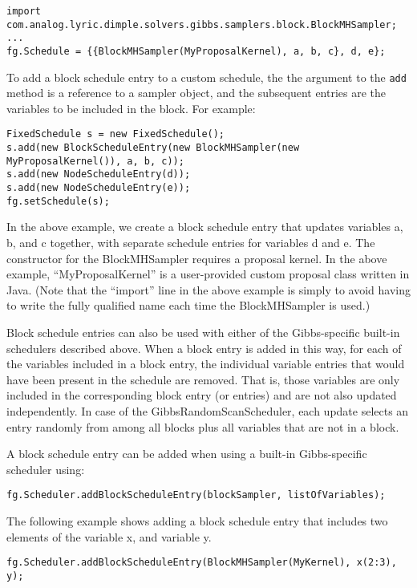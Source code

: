 \begin{lstlisting}
import com.analog.lyric.dimple.solvers.gibbs.samplers.block.BlockMHSampler;
...
fg.Schedule = {{BlockMHSampler(MyProposalKernel), a, b, c}, d, e};
\end{lstlisting}
\fi

\ifjava
To add a block schedule entry to a custom schedule, the the argument to the \texttt{add} method is a reference to a sampler object, and the subsequent entries are the variables to be included in the block.  For example:

\begin{lstlisting}
FixedSchedule s = new FixedSchedule();
s.add(new BlockScheduleEntry(new BlockMHSampler(new MyProposalKernel()), a, b, c));
s.add(new NodeScheduleEntry(d));
s.add(new NodeScheduleEntry(e));
fg.setSchedule(s);
\end{lstlisting}
\fi

In the above example, we create a block schedule entry that updates variables a, b, and c together, with separate schedule entries for variables d and e.  The constructor for the BlockMHSampler requires a proposal kernel.  In the above example, ``MyProposalKernel'' is a user-provided custom proposal class \ifmatlab written in Java\fi.  \ifmatlab (Note that the ``import'' line in the above example is simply to avoid having to write the fully qualified name each time the BlockMHSampler is used.) \fi

Block schedule entries can also be used with either of the Gibbs-specific built-in schedulers described above.  When a block entry is added in this way, for each of the variables included in a block entry, the individual variable entries that would have been present in the schedule are removed.  That is, those variables are only included in the corresponding block entry (or entries) and are not also updated independently.  In case of the GibbsRandomScanScheduler, each update selects an entry randomly from among all blocks plus all variables that are not in a block.

\ifmatlab
A block schedule entry can be added when using a built-in Gibbs-specific scheduler using:
\begin{lstlisting}
fg.Scheduler.addBlockScheduleEntry(blockSampler, listOfVariables);
\end{lstlisting}

The following example shows adding a block schedule entry that includes two elements of the variable x, and variable y.

\begin{lstlisting}
fg.Scheduler.addBlockScheduleEntry(BlockMHSampler(MyKernel), x(2:3), y);
\end{lstlisting}


